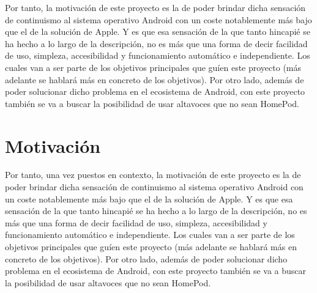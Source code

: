 Por tanto, la motivación de este proyecto es la de poder brindar dicha sensación de continuismo al sistema operativo Android con un coste notablemente más bajo que el de la solución de Apple. Y es que esa sensación de la que tanto hincapié se ha hecho a lo largo de la descripción, no es más que una forma de decir facilidad de uso, simpleza, accesibilidad y funcionamiento automático e independiente. Los cuales van a ser parte de los objetivos principales que guíen este proyecto (más adelante se hablará más en concreto de los objetivos). Por otro lado, además de poder solucionar dicho problema en el ecosistema de Android, con este proyecto también se va a buscar la posibilidad de usar altavoces que no sean HomePod.


\section{Motivación}
Por tanto, una vez puestos en contexto, la motivación de este proyecto es la de poder brindar dicha sensación de continuismo al sistema operativo Android con un coste notablemente más bajo que el de la solución de Apple. Y es que esa sensación de la que tanto hincapié se ha hecho a lo largo de la descripción, no es más que una forma de decir facilidad de uso, simpleza, accesibilidad y funcionamiento automático e independiente. Los cuales van a ser parte de los objetivos principales que guíen este proyecto (más adelante se hablará más en concreto de los objetivos). Por otro lado, además de poder solucionar dicho problema en el ecosistema de Android, con este proyecto también se va a buscar la posibilidad de usar altavoces que no sean HomePod. 
